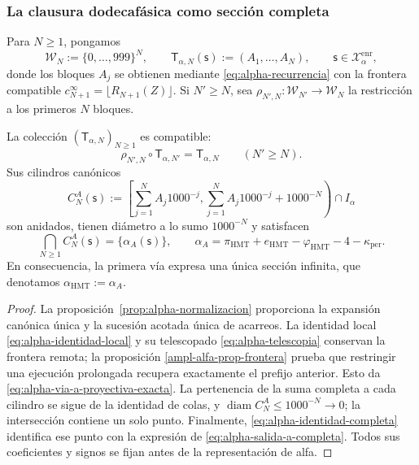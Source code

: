 \subsubsection{La clausura dodecafásica como sección completa}

Para \(N\geq1\), pongamos
\[
 \mathcal W_N:=\{0,\ldots,999\}^{N},
 \qquad
 \mathsf T_{\alpha,N}(\mathsf s):=(A_1,\ldots,A_N),
 \qquad \mathsf s\in\mathcal X_{\alpha}^{\mathrm{enr}},
\]
donde los bloques \(A_j\) se obtienen mediante
\eqref{eq:alpha-recurrencia} con la frontera compatible
\(c_{N+1}^{\infty}=\lfloor R_{N+1}(Z)\rfloor\). Si \(N'\geq N\), sea
\(\rho_{N',N}:\mathcal W_{N'}\to\mathcal W_N\) la restricción a los
primeros \(N\) bloques.

\begin{theorem}
\label{thm:alpha-salida-dodecafasica-completa}
La colección \((\mathsf T_{\alpha,N})_{N\geq1}\) es compatible:
\begin{equation}
 \rho_{N',N}\circ\mathsf T_{\alpha,N'}
 =\mathsf T_{\alpha,N}
 \qquad(N'\geq N).
 \label{eq:alpha-via-a-proyectiva-exacta}
\end{equation}
Sus cilindros canónicos
\begin{equation}
 C_N^A(\mathsf s):=
 \left[
  \sum_{j=1}^{N}A_j1000^{-j},
  \sum_{j=1}^{N}A_j1000^{-j}+1000^{-N}
 \right)\cap I_\alpha
 \label{eq:alpha-cilindros-via-a-exactos}
\end{equation}
son anidados, tienen diámetro a lo sumo \(1000^{-N}\) y satisfacen
\begin{equation}
 \bigcap_{N\geq1}C_N^A(\mathsf s)
 =\{\alpha_A(\mathsf s)\},
 \qquad
 \alpha_A
 =\pi_{\mathrm{HMT}}+e_{\mathrm{HMT}}-\varphi_{\mathrm{HMT}}
  -4-\kappa_{\mathrm{per}}.
 \label{eq:alpha-salida-a-completa}
\end{equation}
En consecuencia, la primera vía expresa una única sección infinita, que
denotamos \(\alpha_{\mathrm{HMT}}:=\alpha_A\).
\end{theorem}

\begin{proof}
La proposición~\ref{prop:alpha-normalizacion} proporciona la expansión
canónica única y la sucesión acotada única de acarreos. La identidad local
\eqref{eq:alpha-identidad-local} y su telescopado
\eqref{eq:alpha-telescopia} conservan la frontera remota; la proposición
\ref{ampl-alfa-prop-frontera} prueba que restringir una ejecución prolongada
recupera exactamente el prefijo anterior. Esto da
\eqref{eq:alpha-via-a-proyectiva-exacta}. La pertenencia de la suma completa
a cada cilindro se sigue de la identidad de colas, y
\(\operatorname{diam}C_N^A\leq1000^{-N}\to0\); la intersección contiene un
solo punto. Finalmente, \eqref{eq:alpha-identidad-completa} identifica ese
punto con la expresión de \eqref{eq:alpha-salida-a-completa}. Todos sus
coeficientes y signos se fijan antes de la representación de alfa.
\end{proof}

